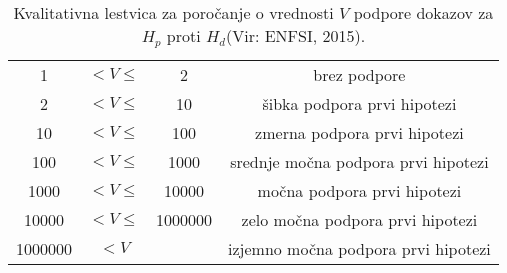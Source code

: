 \documentclass[12pt,a4paper]{amsart}
\theoremstyle{definition} %
\theoremstyle{plain} %
\begin{document}
\begin{table}[h!]
    \centering
    \caption{Kvalitativna lestvica za poročanje o vrednosti $V$ podpore dokazov za $H_p$ proti $H_d$(Vir: ENFSI, 2015).}
    \label{table:1} 
     \begin{tabular}{c c c c}
        \hline 
        1 & $< V \le$  & 2 & brez podpore \\ 
        2 & $< V \le$ & 10 & šibka podpora prvi hipotezi \\ 
        10 & $< V \le$ & 100 & zmerna podpora prvi hipotezi \\
        100 & $< V \le$ & 1000 & srednje močna podpora prvi hipotezi \\
        1000 & $< V \le$ & 10000 & močna podpora prvi hipotezi \\
        10000 & $< V \le$ & 1000000 & zelo močna podpora prvi hipotezi \\ 
        1000000 & $< V $ & & izjemno močna podpora prvi hipotezi \\ [1ex] 
        \hline
     \end{tabular}
\end{table}

\end{document}
